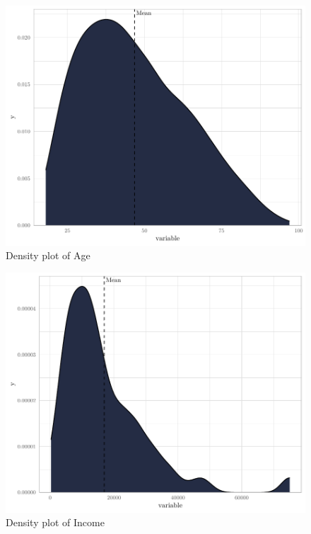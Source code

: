 \documentclass[
]{article}
\begin{document}
\begin{figure}[H]

{\centering \includegraphics[width=0.8\linewidth]{paper_files/figure-latex/unnamed-chunk-11-1} 

}

\caption{Density plot of Age}\label{fig:unnamed-chunk-11}
\end{figure}

\begin{figure}[H]

{\centering \includegraphics[width=0.8\linewidth]{paper_files/figure-latex/unnamed-chunk-12-1} 

}

\caption{Density plot of Income}\label{fig:unnamed-chunk-12}
\end{figure}
\end{document}
